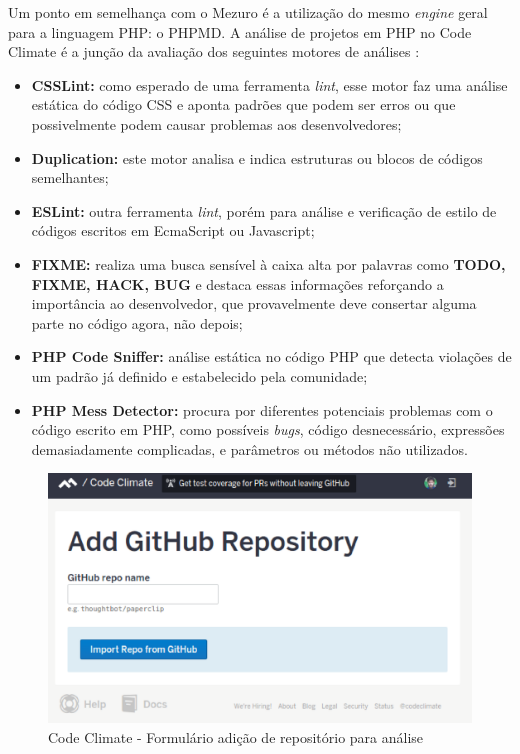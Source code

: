 Um ponto em semelhança com o Mezuro é a utilização do mesmo \textit{engine}
geral para a linguagem PHP: o PHPMD. A análise de projetos em PHP no Code Climate
é a junção da avaliação dos seguintes motores de análises \cite{codeClimateDoc}:

\begin{itemize}
  \item \textbf{CSSLint:} como esperado de uma ferramenta \textit{lint}, esse
	motor faz uma análise estática do código CSS e aponta padrões que podem ser
	erros ou que possivelmente podem causar problemas aos desenvolvedores;
	\item \textbf{Duplication:} este motor analisa e indica estruturas ou blocos
	de códigos semelhantes;
	\item \textbf{ESLint:} outra ferramenta \textit{lint}, porém para análise e
	verificação de estilo de códigos escritos em EcmaScript ou Javascript;
	\item \textbf{FIXME:} realiza uma busca sensível à caixa alta por palavras
	como \textbf{TODO, FIXME, HACK, BUG} e destaca essas informações reforçando a
	importância ao desenvolvedor, que provavelmente deve consertar alguma parte no
	código agora, não depois;
	\item \textbf{PHP Code Sniffer:} análise estática no código PHP que detecta
	violações de um padrão já definido e estabelecido pela comunidade;
	\item \textbf{PHP Mess Detector:} procura por diferentes potenciais problemas
	com o código escrito em PHP, como possíveis \textit{bugs}, código desnecessário,
	expressões demasiadamente complicadas, e parâmetros ou métodos não utilizados.
\end{itemize}

\begin{figure}[h]
  \centering
    \includegraphics[keepaspectratio=true,scale=0.5]
    {figuras/form_codeClimate.eps}
  \caption{Code Climate - Formulário adição de repositório para análise}
  \label{fig:form_codeClimate}
\end{figure}

